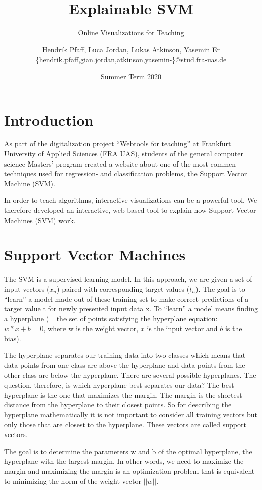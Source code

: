 \documentclass{scrartcl}
\title{Explainable SVM}
\subtitle{Online Visualizations for Teaching}
\author{
  Hendrik Pfaff, Luca Jordan, Lukas Atkinson, Yasemin Er
  \\
  {\normalsize\ttfamily \{hendrik.pfaff,gian.jordan,atkinson,yasemin-\}@stud.fra-uas.de}
}
\date{Summer Term 2020}
\begin{document}
\maketitle

\section{Introduction}
As part of the digitalization project “Webtools for teaching” at Frankfurt University of Applied Sciences (FRA UAS), students of the general computer science Masters’ program created a website about one of the most commen techniques used for regression- and classification problems, the Support Vector Machine (SVM). 

In order to teach algorithms, interactive visualizations can be a powerful tool.
We therefore developed an interactive, web-based tool
to explain how Support Vector Machines (SVM) work.

\section{Support Vector Machines}
The SVM is a supervised learning model. In this approach, we are given a set of input vectors ($x_n$) paired with corresponding target values ($t_n$). 
The goal is to “learn” a model made out of these training set to make correct predictions of a target value t for newly presented input data x. 
To “learn” a model means finding a hyperplane (= the set of points satisfying the hyperplane equation: $w*x+b = 0$, where w is the weight vector, $x$ is the input vector and $b$ is the bias).

The hyperplane separates our training data into two classes which means that data points from one class are above the hyperplane and data points from the other class are below the hyperplane. 
There are several possible hyperplanes. The question, therefore, is which hyperplane best separates our data? The best hyperplane is the one that maximizes the margin. The margin is the shortest distance from the hyperplane to their closest points. 
So for describing the hyperplane mathematically it is not important to consider all training vectors but only those that are closest to the hyperplane. These vectors are called support vectors. 

The goal is to determine the parameters w and b of the optimal hyperplane, the hyperplane with the largest margin. In other words, we need to maximize the margin and maximizing the margin is an optimization problem that is equivalent to minimizing the norm of the weight vector $||w||$. 
\end{document}
